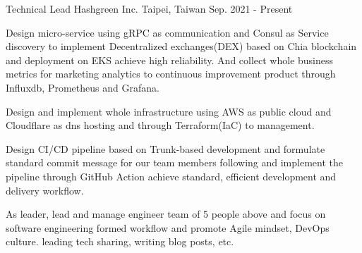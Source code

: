 

\begin{cventries}

\cventry
{Technical Lead} %
{Hashgreen Inc.} %
{Taipei, Taiwan} %
{Sep. 2021 - Present} %
{
  \begin{cvitems} %
    \item {Design micro-service using gRPC as communication and Consul as Service discovery to implement Decentralized exchanges(DEX) based on Chia blockchain and deployment on EKS achieve high reliability. And collect whole business metrics for marketing analytics to continuous improvement product through Influxdb, Prometheus and Grafana.}
    \item {Design and implement whole infrastructure using AWS as public cloud and Cloudflare as dns hosting and through Terraform(IaC) to management.}
    \item {Design CI/CD pipeline based on Trunk-based development and formulate standard commit message for our team members following and implement the pipeline through GitHub Action achieve standard, efficient development and delivery workflow.}
    \item {As leader, lead and manage engineer team of 5 people above and focus on software engineering formed workflow and promote Agile mindset, DevOps culture. leading tech sharing, writing blog posts, etc.}
  \end{cvitems}
}


\end{cventries}
